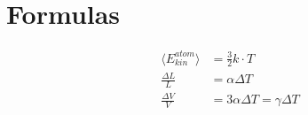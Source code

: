 \documentclass[11pt,letterpaper]{article}
\begin{document}
{
 
 \maketitle
   
 \tableofcontents

 \section{Formulas}{
    \begin{align*}
        \langle E_{kin}^{atom}\rangle&=\frac{3}{2}k\cdot T \\
        \frac{\Delta L}{L}&=\alpha \Delta T\\
        \frac{\Delta V}{V} &= 3 \alpha \Delta T = \gamma \Delta T\\
    \end{align*}
 }
 }
\end{document}
